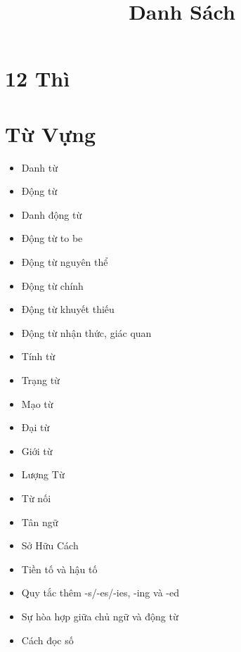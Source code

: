 \title{\Huge \textbf{Danh Sách}}
\maketitle
\tableofcontents

\chapter{12 Thì}
\chapter{Từ Vựng}
\begin{multicols}{2}
\begin{itemize}
    \item Danh từ
	\item Động từ
	\item Danh động từ
	\item Động từ to be
	\item Động từ nguyên thể
	\item Động từ chính
	\item Động từ khuyết thiếu
	\item Động từ nhận thức, giác quan
	\item Tính từ
	\item Trạng từ
	\item Mạo từ
	\item Đại từ
	\item Giới từ
	\item Lượng Từ
	\item Từ nối
	\item Tân ngữ
	\item Sở Hữu Cách
	\item Tiền tố và hậu tố
	\item Quy tắc thêm -s/-es/-ies, -ing và -ed
	\item Sự hòa hợp giữa chủ ngữ và động từ
	\item Cách đọc số
\end{itemize}
\end{multicols}

